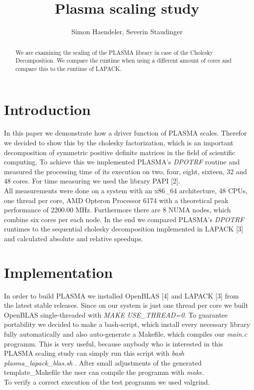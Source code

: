 \documentclass[a4paper,final,ngerman,english]{article}
\begin{document}
\lstset{postbreak=\space,breakindent=5pt,breaklines,basicstyle=\scriptsize,frame=trbl,label=DescriptiveLabel} %
\pagestyle{headings}
%
\title{Plasma scaling study}
\author{Simon Haendeler, Severin Staudinger}
\maketitle
%
\begin{abstract}
	We are examining the scaling of the PLASMA library in case of the Cholesky Decomposition.
	We compare the runtime when using a different amount of cores and compare this to the runtime
	of LAPACK\@.
\end{abstract}
\section{Introduction}
In this paper we demonstrate how a driver function of PLASMA \cite{plasma01} scales.
Therefor we decided to show this by the cholesky factorization, which is an important decomposition of symmetric positive definite matrices in the field of scientific computing.
To achieve this we implemented PLASMA's \textit{DPOTRF} routine and measured the processing time of its execution on two, four, eight, sixteen, 32 and 48 cores. For time measuring we used the library PAPI [2].\\
All measurements were done on a system with an x86\_64 architecture, 48 CPUs, one thread per core, AMD Opteron\texttrademark{} Processor 6174 with a theoretical peak performance of 2200.00 MHz. Furthermore there are 8 NUMA nodes, which combine six cores per each node.
In the end we compared PLASMA's \textit{DPOTRF} runtimes to the sequential cholesky decomposition implemented in LAPACK [3] and calculated absolute and relative speedups.

\section{Implementation}
In order to build PLASMA we installed OpenBLAS [4] and LAPACK [3] from the latest stable releases.
Since on our system is just one thread per core we built OpenBLAS single-threaded with \textit{MAKE USE\_THREAD=0}.
To guarantee portability we decided to make a bash-script, which install every necessary library fully automatically and also auto-generate a Makefile, which compiles our \textit{main.c} programm.
This is very useful, because anybody who is interested in this PLASMA scaling study can simply run this script with \textit{bash plasma\_lapack\_blas.sh} .
After small adjustments of the generated template\_Makefile the user can compile the programm with \textit{make}.
\\
To verify a correct execution of the test programm we used valgrind.
\end{document}
